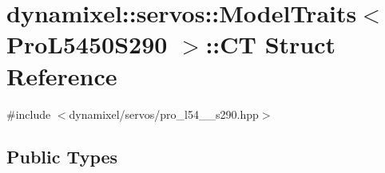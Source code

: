 \hypertarget{structdynamixel_1_1servos_1_1_model_traits_3_01_pro_l5450_s290_01_4_1_1_c_t}{}\section{dynamixel\+:\+:servos\+:\+:Model\+Traits$<$ Pro\+L5450\+S290 $>$\+:\+:C\+T Struct Reference}
\label{structdynamixel_1_1servos_1_1_model_traits_3_01_pro_l5450_s290_01_4_1_1_c_t}


{\ttfamily \#include $<$dynamixel/servos/pro\+\_\+l54\+\_\+\_\+s290.\+hpp$>$}

\subsection*{Public Types}
